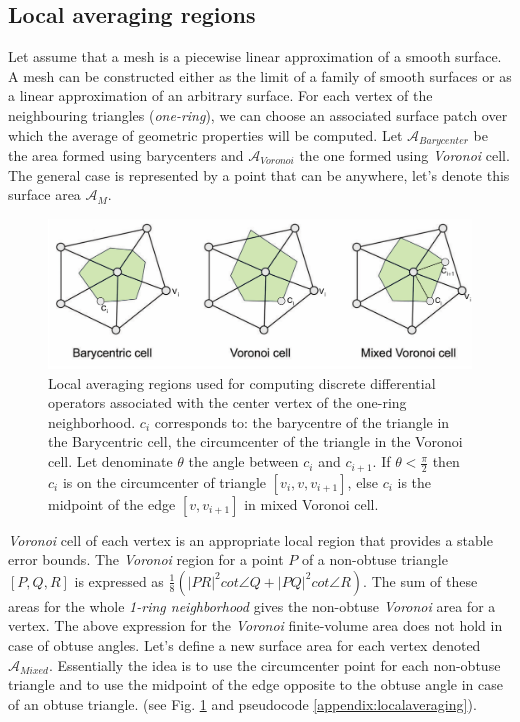 \subsection{Local averaging regions} \label{section:localaveraging}
Let assume that a mesh is a piecewise linear approximation of a smooth surface.
A mesh can be constructed either as the limit of a family of smooth surfaces or as a linear approximation of an arbitrary surface. For each vertex of the neighbouring triangles (\textit{one-ring}), we can choose an associated surface patch over which the average of geometric properties will be computed.
Let $\mathcal{A}_{Barycenter}$ be the area formed using barycenters and $\mathcal{A}_{Voronoi}$ the one formed using \textit{Voronoi} cell. The general case is represented by a point that can be anywhere, let's denote this surface area $\mathcal{A}_M$.
\begin{figure}[!h]
    \centering
    \includegraphics[scale=0.35]{images/localregions.png}
    \caption{Local averaging regions used for computing discrete differential operators associated with the center vertex of the one-ring neighborhood. $c_i$ corresponds to: the barycentre of the triangle in the Barycentric cell, the circumcenter of the triangle in the Voronoi cell. Let denominate $\theta$ the angle between $c_i$ and $c_{i+1}$. If $\theta < \frac{\pi}{2}$ then $c_i$ is on the circumcenter of triangle $[v_i, v, v_{i+1}]$, else $c_i$ is the midpoint of the edge $[v, v_{i+1}]$ in mixed Voronoi cell.  \cite{polygonmeshprocessing}} \label{fig:localregions}
\end{figure}
\textit{Voronoi} cell of each vertex is an appropriate local region that provides a stable error bounds.
The \textit{Voronoi} region for a point $P$ of a non-obtuse triangle $[P, Q, R]$ is expressed as $\frac{1}{8}(| PR|^2 cot \angle Q + |PQ |^2 cot \angle R)$. The sum of these areas for the whole \textit{1-ring neighborhood} gives the non-obtuse \textit{Voronoi} area for a vertex. The above expression for the \textit{Voronoi} finite-volume area does not hold in case of obtuse angles. Let's define a new surface area for each vertex denoted $\mathcal{A}_{Mixed}$. Essentially the idea is to use the circumcenter point for each non-obtuse triangle and to use the midpoint of the edge opposite to the obtuse angle in case of an obtuse triangle. (see Fig. \ref{fig:localregions} and pseudocode \ref{appendix:localaveraging}). \cite{meshlab}

